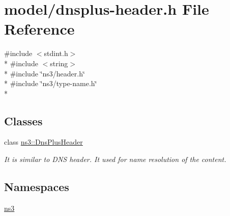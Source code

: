 \hypertarget{dnsplus-header_8h}{\section{model/dnsplus-\/header.h File Reference}
\label{dnsplus-header_8h}
}
{\ttfamily \#include $<$stdint.\-h$>$}\\*
{\ttfamily \#include $<$string$>$}\\*
{\ttfamily \#include \char`\"{}ns3/header.\-h\char`\"{}}\\*
{\ttfamily \#include \char`\"{}ns3/type-\/name.\-h\char`\"{}}\\*
\subsection*{Classes}
\begin{DoxyCompactItemize}
\item 
class \hyperlink{classns3_1_1DnsPlusHeader}{ns3\-::\-Dns\-Plus\-Header}
\begin{DoxyCompactList}\small\item\em It is similar to D\-N\-S header. It used for name resolution of the content. \end{DoxyCompactList}\end{DoxyCompactItemize}
\subsection*{Namespaces}
\begin{DoxyCompactItemize}
\item 
\hyperlink{namespacens3}{ns3}
\end{DoxyCompactItemize}
